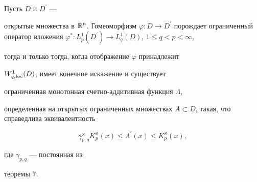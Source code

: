\begin{thm}


Пусть $D$ и $D^{\prime}$ ---


открытые множества в ${\Bbb R}^n$. Гомеоморфизм $\varphi :D\to


D^{\prime}$ порождает ограниченный оператор вложения $\varphi^{*}


:L_{p}^{1}(D^{\prime})\to L_{q}^{1}(D)$, $1\leq q< p<\infty$,


тогда и только тогда, когда отображение $\varphi$ принадлежит


$W^1_{q,\operatorname{loc}}(D)$, имеет конечное искажение и существует


ограниченная монотонная счетно-аддитивная функция $\Lambda$,


определенная на открытых ограниченных множествах $A\subset


D$, такая, что справедлива эквивалентность


$$


\gamma^{\varkappa}_{p,q} K^{\varkappa}_{p}(x)\leq\Lambda^{\prime}(x)


\leq K^{\varkappa}_p(x),


$$


где $\gamma_{p,q}$ --- постоянная из


теоремы $7$.


\end{thm}






